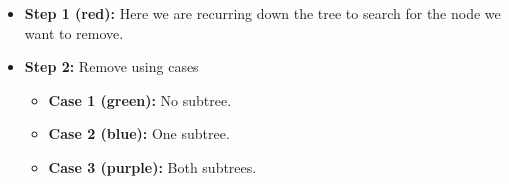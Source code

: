 \documentclass{beamer}
\begin{document}
\begin{frame}
\begin{minipage}{0.60\textwidth}
\begin{algorithm}[H]
{                
            }
    \end{algorithm}
    \end{minipage}
    \hfill
    \begin{minipage}{0.39\textwidth}
        \begin{itemize}
            \item \textbf{Step 1 (red): } Here we are recurring down the tree to search for the node we want to remove.
            \pause
            \item \textbf{Step 2: } Remove using cases
            \pause
            \begin{itemize}
                \item \textbf{Case 1 (green):} No subtree.
                \pause
                \item \textbf{Case 2 (blue):} One subtree.
                \pause
                \item \textbf{Case 3 (purple): } Both subtrees.
            \end{itemize}
        \end{itemize}
    \end{minipage}
\end{frame}
\end{document}
